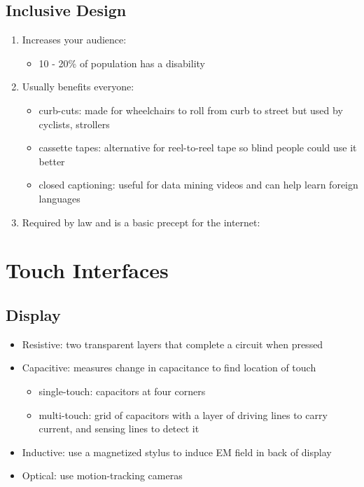 \documentclass[]{article}
\theoremstyle{definition}
\begin{document}
	\subsection{Inclusive Design}
	\begin{enumerate}
		\item Increases your audience:
			\begin{itemize}
				\item 10 - 20\% of population has a disability
			\end{itemize}
		\item Usually benefits everyone:
			\begin{itemize}
				\item curb-cuts: made for wheelchairs to roll from curb to street but used by cyclists, strollers
				\item cassette tapes: alternative for reel-to-reel tape so blind people could use it better
				\item closed captioning: useful for data mining videos and can help learn foreign languages
			\end{itemize}
		\item Required by law and is a basic precept for the internet:
	\end{enumerate}

	\section{Touch Interfaces}
	\subsection{Display}
	\begin{itemize}
		\item Resistive: two transparent layers that complete a circuit when pressed
		\item Capacitive: measures change in capacitance to find location of touch
			\begin{itemize}
				\item single-touch: capacitors at four corners
				\item multi-touch: grid of capacitors with a layer of driving lines to carry current, and sensing lines to detect it
			\end{itemize}
		\item Inductive: use a magnetized stylus to induce EM field in back of display
		\item Optical: use motion-tracking cameras
	\end{itemize}
\end{document}
